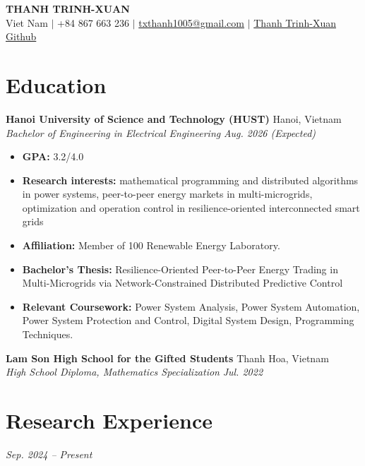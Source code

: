 \documentclass[11pt,letterpaper]{article}
\newcommand{\cventry}[4]{
  \noindent\textbf{#1} \hfill #2 \\
  \noindent\textit{#3} \hfill \textit{#4}
}
\newcommand{\cvproject}[3]{
  \noindent\textbf{#1} $|$ \textit{#2} \hfill #3
}
\begin{document}
\begin{center}
    {\LARGE \textbf{THANH TRINH-XUAN}} \\[1ex]
    Viet Nam $|$ +84 867 663 236 $|$ \href{mailto:txthanh1005@gmail.com}{txthanh1005@gmail.com} $|$ \href{https://github.com/txthanh1005-maker/CV_design/tree/main/Research_Portfolio}{Thanh Trinh-Xuan Github}
\end{center}

\vspace{1ex}

\section*{Education}

\cventry{Hanoi University of Science and Technology (HUST)}{Hanoi, Vietnam}{Bachelor of Engineering in Electrical Engineering}{Aug. 2026 (Expected)}
\begin{itemize}[leftmargin=0.25in, itemsep=0pt, topsep=0pt]
    \item \textbf{GPA:} 3.2/4.0
    \item \textbf{Research interests:} mathematical programming and distributed algorithms in power systems, peer-to-peer energy markets in multi-microgrids, optimization and operation control in resilience-oriented interconnected smart grids
    \item \textbf{Affiliation:} Member of 100 Renewable Energy Laboratory.
    \item \textbf{Bachelor's Thesis:} Resilience-Oriented Peer-to-Peer Energy Trading in Multi-Microgrids via Network-Constrained Distributed Predictive Control
    \item \textbf{Relevant Coursework:} Power System Analysis, Power System Automation, Power System Protection and Control, Digital System Design, Programming Techniques.
\end{itemize}

\vspace{1ex}

\cventry{Lam Son High School for the Gifted Students}{Thanh Hoa, Vietnam}{High School Diploma, Mathematics Specialization}{Jul. 2022}

\vspace{1ex}

\section*{Research Experience}
 \hfill \textit{Sep. 2024 -- Present}
\end{document}

